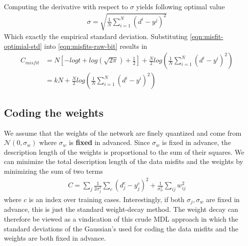 \documentclass[../../main.tex]{subfiles}
\numberwithin{equation}{section}
\begin{document}
Computing the derivative with respect to $\sigma$ yields following optimal value 
\begin{align}
    \sigma = \sqrt{\frac{1}{N}\sum\limits_{i=1}^N (d^i-y^j)^2}
\end{align}\label{eqn:misfit-optimial-std}
Which exactly the empirical standard deviation. Substituting \ref{eqn:misfit-optimial-std} into \ref{eqn:misfits-raw-bit} results in 
\begin{align}
    C_{misfit}&=N[-logt + log(\sqrt{2\pi})+\frac{1}{2}] + \frac{N}{2}log(\frac{1}{N}\sum\limits_{i=1}^N (d^i-y^i)^2)\\
    &=kN+\frac{N}{2}log(\frac{1}{N}\sum\limits_{i=1}^N (d^i-y^i)^2)
\end{align}

\subsection{Coding the weights}
We assume that the weights of the network are finely quantized and come from $\mathcal{N}(0, \sigma_w)$ where $\sigma_w$ is \textbf{fixed} in advanced. Since $\sigma_w$ is fixed in advance, the description length of the weights is proportional to the sum of their squares. We can minimize the total description length of the data misfits and the weights by minimizing the sum of two terms
\begin{align}
    C=\sum\limits_j\frac{1}{2\sigma_j^2}\sum\limits_c (d_j^c-y_j^c)^2 + \frac{1}{\sigma_w^2}\sum\limits_{ij}w_{ij}^2
\end{align}
where $c$ is an index over training cases. Interestingly, if both $\sigma_j, \sigma_w$ are fixed in advance, this is just the standard weight-decay method. The weight decay can therefore be viewed as a vindication of this crude MDL approach in which the standard deviations of the Gaussian's used for coding the data misfits and the weights are both fixed in advance.
\end{document}
